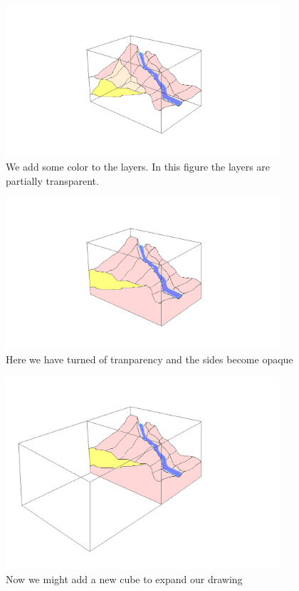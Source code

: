 \documentclass[12pt,a4paper]{article}
\begin{document}
\begin{figure}
\centering
\includegraphics[width=4in]{addColor}
\caption[]{
  \footnotesize
  We add some color to the layers. In this figure the layers are partially transparent.
  \label{fig:addColor}
}
\end{figure}

\begin{figure}
\centering
\includegraphics[width=4in]{offTransparency}
\caption[]{
  \footnotesize
  Here we have turned of tranparency and the sides become opaque
  \label{fig:offTransparency}
}
\end{figure}

\begin{figure}
\centering
\includegraphics[width=4in]{newCube}
\caption[]{
  \footnotesize
  Now we might add a new cube to expand our drawing
  \label{fig:newCube}
}
\end{figure}
\end{document}

